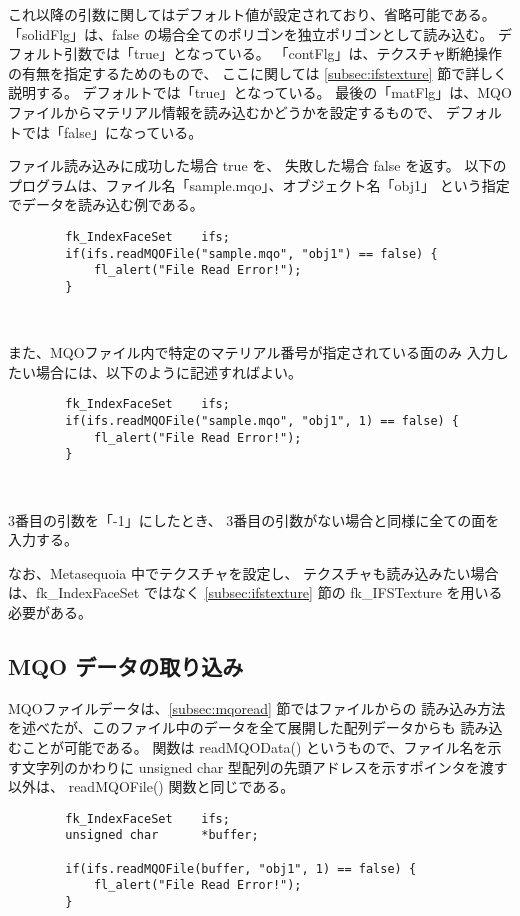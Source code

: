 これ以降の引数に関してはデフォルト値が設定されており、省略可能である。
「solidFlg」は、false の場合全てのポリゴンを独立ポリゴンとして読み込む。
デフォルト引数では「true」となっている。
「contFlg」は、テクスチャ断絶操作の有無を指定するためのもので、
ここに関しては \ref{subsec:ifstexture} 節で詳しく説明する。
デフォルトでは「true」となっている。
最後の「matFlg」は、MQOファイルからマテリアル情報を読み込むかどうかを設定するもので、
デフォルトでは「false」になっている。

ファイル読み込みに成功した場合 true を、
失敗した場合 false を返す。
以下のプログラムは、ファイル名「sample.mqo」、オブジェクト名「obj1」
という指定でデータを読み込む例である。
\\
\begin{screen}
\begin{verbatim}
        fk_IndexFaceSet    ifs;
        if(ifs.readMQOFile("sample.mqo", "obj1") == false) {
            fl_alert("File Read Error!");
        }
\end{verbatim}
\end{screen} ~

また、MQOファイル内で特定のマテリアル番号が指定されている面のみ
入力したい場合には、以下のように記述すればよい。
\begin{screen}
\begin{verbatim}
        fk_IndexFaceSet    ifs;
        if(ifs.readMQOFile("sample.mqo", "obj1", 1) == false) {
            fl_alert("File Read Error!");
        }
\end{verbatim}
\end{screen} ~

3番目の引数を「-1」にしたとき、
3番目の引数がない場合と同様に全ての面を入力する。

なお、Metasequoia 中でテクスチャを設定し、
テクスチャも読み込みたい場合は、fk\_IndexFaceSet ではなく
\ref{subsec:ifstexture} 節の fk\_IFSTexture を用いる必要がある。

\subsection{MQO データの取り込み} \label{subsec:mqodata}
MQOファイルデータは、\ref{subsec:mqoread} 節ではファイルからの
読み込み方法を述べたが、このファイル中のデータを全て展開した配列データからも
読み込むことが可能である。
関数は readMQOData() というもので、ファイル名を示す文字列のかわりに
unsigned char 型配列の先頭アドレスを示すポインタを渡す以外は、
readMQOFile() 関数と同じである。
\begin{screen}
\begin{verbatim}
        fk_IndexFaceSet    ifs;
        unsigned char      *buffer;

        if(ifs.readMQOFile(buffer, "obj1", 1) == false) {
            fl_alert("File Read Error!");
        }
\end{verbatim}
\end{screen} ~

